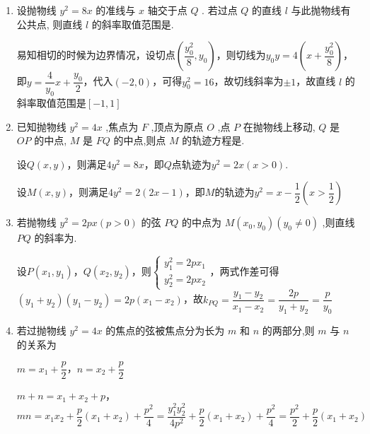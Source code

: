 \begin{enumerate}
    \item 设抛物线 ${y}^{2} = {8x}$ 的准线与 $x$ 轴交于点 $Q$ . 若过点 $Q$ 的直线 $l$ 与此抛物线有公共点, 则直线 $l$ 的斜率取值范围是\blkda{$[-1, 1]$}.
    \begin{jieda}
        易知相切的时候为边界情况，设切点$\left(\dfrac{y_0^2}{8}, y_0\right)$，则切线为$y_0y = 4\left(x+\dfrac{y_0^2}{8}\right)$，即$y = \dfrac{4}{y_0}x + \dfrac{y_0}{2}$，代入$(-2, 0)$，可得$y_0^2 = 16$，故切线斜率为$\pm 1$，故直线 $l$ 的斜率取值范围是$[-1, 1]$
    \end{jieda}


    \item 已知抛物线 ${y}^{2} = {4x}$ ,焦点为 $F$ ,顶点为原点 $O$ ,点 $P$ 在抛物线上移动, $Q$ 是 ${OP}$ 的中点, $M$ 是 ${FQ}$ 的中点,则点 $M$ 的轨迹方程是.
    \begin{jieda}
        设$Q(x, y)$，则满足$4{y}^{2} = 8x$，即$Q$点轨迹为$y^2 = 2x(x > 0)$.

        设$M(x, y)$，则满足$4y^2 = 2(2x-1)$，即$M$的轨迹为$y^2 = x-\dfrac{1}{2} \left(x > \dfrac{1}{2}\right)$
    \end{jieda}


    \item 若抛物线 ${y}^{2} = {2px}\left( {p > 0}\right)$ 的弦 ${PQ}$ 的中点为 $M\left( {{x}_{0},{y}_{0}}\right) \left( {{y}_{0} \neq  0}\right)$ ,则直线 ${PQ}$ 的斜率为.
    \begin{jieda}
        设$P(x_1, y_1)$，$Q(x_2, y_2)$，则$\left\{\begin{array}{l}
             y_1^2 = 2px_1  \\
             y_2^2 = 2px_2 
        \end{array}\right.$，两式作差可得$(y_1+y_2)(y_1-y_2) = 2p(x_1-x_2)$，故$k_{PQ} = \dfrac{y_1-y_2}{x_1-x_2} = \dfrac{2p}{y_1+y_2} = \dfrac{p}{y_0}$
    \end{jieda}


    \item 若过抛物线 ${y}^{2} = {4x}$ 的焦点的弦被焦点分为长为 $m$ 和 $n$ 的两部分,则 $m$ 与 $n$ 的关系为
    \begin{jieda}
        $m = x_1+\dfrac{p}{2}$，$n = x_2+\dfrac{p}{2}$

        $m+n = x_1+x_2+p$，$mn = x_1x_2+\dfrac{p}{2}\left(x_1+x_2\right)+\dfrac{p^2}{4} = \dfrac{y_1^2y_2^2}{4p^2}+\dfrac{p}{2}\left(x_1+x_2\right) + \dfrac{p^2}{4} = \dfrac{p^2}{2}+\dfrac{p}{2}\left(x_1+x_2\right)$


\end{jieda}
\end{enumerate}
